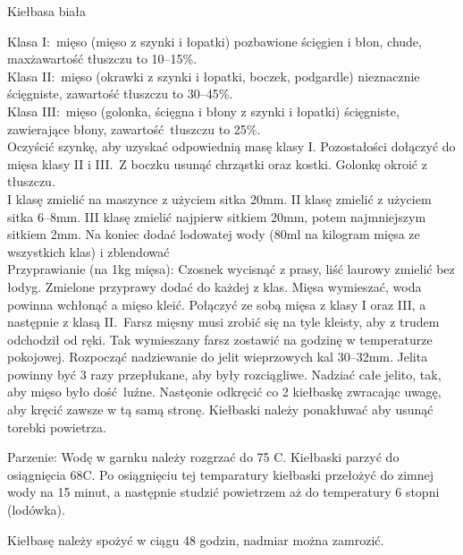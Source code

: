\documentclass[a4paper,12pt]{article}
\begin{document}
\begin{recipe}{Kiełbasa biała}{}{}


\freeform%
Klasa I:\ mięso  (mięso z szynki i łopatki) pozbawione ścięgien i błon, chude, max\. zawartość tłuszczu to 10--15\%. \\
Klasa II:\ mięso (okrawki z szynki i łopatki, boczek, podgardle) nieznacznie ścięgniste, zawartość tłuszczu to 30--45\%. \\
Klasa III:\ mięso (golonka, ścięgna i błony z szynki i łopatki) ścięgniste, zawierające błony, zawartość tłuszczu to 25\%.\\

Oczyścić szynkę, aby uzyskać odpowiednią masę klasy I. Pozostałości dołączyć do mięsa klasy II i III.\
Z boczku usunąć chrząstki oraz kostki. Golonkę okroić z tłuszczu.\\
I klasę zmielić na maszynce z użyciem sitka 20mm. 
II klasę zmielić z użyciem sitka 6--8mm.
III klasę zmielić najpierw sitkiem 20mm, potem najmniejszym sitkiem 2mm. Na koniec dodać lodowatej wody (80ml na kilogram mięsa ze wszystkich klas) i zblendować \\

Przyprawianie (na 1kg mięsa):
Czosnek wycisnąć z prasy, liść laurowy zmielić bez łodyg. Zmielone przyprawy dodać do każdej z klas.
Mięsa wymieszać, woda powinna wchłonąć a mięso kleić.
Połączyć ze sobą mięsa z klasy I oraz III, a następnie z klasą II.\
Farsz mięsny musi zrobić się na tyle kleisty, aby z trudem odchodził od ręki. Tak wymieszany farsz
zostawić na godzinę w temperaturze pokojowej.
\freeform%
Rozpocząć nadziewanie do jelit wieprzowych kal 30--32mm.
Jelita powinny być 3 razy przepłukane, aby były rozciągliwe. Nadziać całe jelito, tak, aby mięso było dość luźne.
Nastęonie odkręcić co 2 kiełbaskę zwracając uwagę, aby kręcić zawsze w tą samą stronę.
Kiełbaski należy ponakłuwać aby usunąć torebki powietrza.

Parzenie:
Wodę w garnku należy rozgrzać do 75 \0C. Kiełbaski parzyć do osiągnięcia 68\0C. 
Po osiągnięciu tej temparatury kiełbaski przełożyć do zimnej wody na 15 minut, a następnie studzić powietrzem aż do temperatury 6 stopni (lodówka).

Kiełbasę należy spożyć w ciągu 48 godzin, nadmiar można zamrozić.

\end{recipe}
\end{document}
